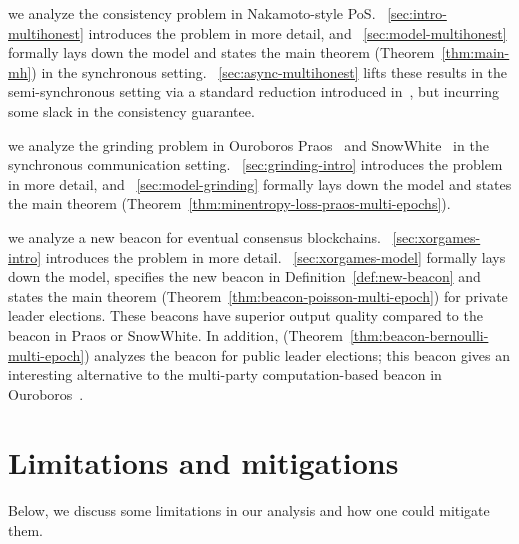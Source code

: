 \begin{description}[font=\normalfont\ ]
  \item[In Part~\ref{part:multihonest},]
    we analyze the consistency problem in Nakamoto-style PoS.
    \Section~\ref{sec:intro-multihonest} introduces the problem in more detail, 
    and \Section~\ref{sec:model-multihonest} formally lays down the model and 
    states the main theorem (Theorem~\ref{thm:main-mh}) in the synchronous setting.
    \Section~\ref{sec:async-multihonest} lifts these results in the semi-synchronous setting 
    via a standard reduction introduced in~\cite{Praos}, 
    but incurring some slack in the consistency guarantee. 
  
  \item[In Part~\ref{part:praos},]
    we analyze the grinding problem in Ouroboros Praos~\cite{Praos} and SnowWhite~\cite{SnowWhite} 
    in the synchronous communication setting.
    \Section~\ref{sec:grinding-intro} introduces the problem in more detail, 
    and \Section~\ref{sec:model-grinding} formally lays down the model and 
    states the main theorem (Theorem~\ref{thm:minentropy-loss-praos-multi-epochs}). 

  \item[In Part~\ref{part:xorgames},]
    we analyze a new beacon for eventual consensus blockchains. 
    \Section~\ref{sec:xorgames-intro} introduces the problem in more detail. 
    \Section~\ref{sec:xorgames-model} formally lays down the model, 
    specifies the new beacon in Definition~\ref{def:new-beacon} and 
    states the main theorem (Theorem~\ref{thm:beacon-poisson-multi-epoch}) 
    for private leader elections.
    These beacons have superior output quality compared to the beacon in Praos or SnowWhite. 
    In addition, (Theorem~\ref{thm:beacon-bernoulli-multi-epoch}) 
    analyzes the beacon for public leader elections; 
    this beacon gives an interesting alternative to the multi-party computation-based 
    beacon in Ouroboros~\cite{Ouroboros}.
\end{description}




\section{Limitations and mitigations}
Below, we discuss some limitations in our analysis 
and how one could mitigate them.


